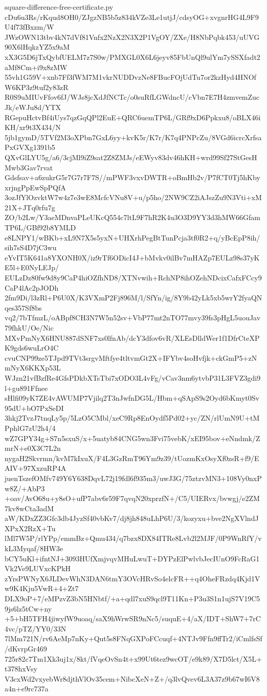 \documentclass[11pt]{article}
\theoremstyle{definition}
\theoremstyle{remark}
\begin{document}
\begin{filecontents*}[overwrite]{square-difference-free-certificate.py}
cDu6u3Rs/rKqud8OH0/ZJgzNB5b5z834kVZe3Le1utjJ/cdsyOG+xvgnrHG4L9F9U4f73fBxzm/W
JWzOWN13tbv4kN7dVf81Vnfx2NzX2N3X2P1VgOY/ZXe/H8NbPqbk453/uUVG90X6lHqkzYZ5x9aM
xX3G5D6jTxQybfUELM7z7S0w/PMXGL0X6L6jeyv85FbUnQl9ulYm7ySSXfadt2aMf8Cm+i9x8zMW
55vh1G59V+xnb7Ff3fWM7M1vkrNUDDvzNe8FBucFOjUdTu7or2kzHyd4HNOfW6KP3z9tuf2y83zR
R0S9uMIUvFfov6fJ/WJs8jcXdJfNCTc/o0suRfLGWdncU/cVbn7E7H4zmvemZucJk/eWJu8d/YTX
RGepuHctvBf4iUys7qzGqQPl2EuE+QRC6uemTP6L/GRf9xD6Ppkxu8/oBLX46iKH/xr9t3X434/N
5jb1gymD/5TVf2M3oXPbn7GxL6yy+kvK5r/K7r/K7q4PNPcZu/8VGd6icrcXrfsaPxGVXg1391b5
QXvGlLYU5g/a6/3cjMl9iZ9sat2Z8ZMJs/eEWyv83dv46hKH+wrd99Sf27StGesHMwb3Gav7rvat
Gdsfsav+a6zukrG5r7G7r7F7S//mPWF3vxvDWTR+oBmHb2v/P7fCT0Tj5hKbyxrjngPpEwSpPQfA
3ozJfYlOzvktW7w4z7e3wE8McfcVNu8V+u/p5ho/2NW9CZ2iAJszZu9N3Vti+xM21X+JTq0rfu7g
ZO/b2Lw/Y3aeMDnvaPLeUKcQ554c7ltL9F7hR2K4u3O3D9YY3d3hMW66GfamTP6L/GBf92b8YMLD
e8LNPY1/wBKb+xL9N7X5s5yxN+UHXrhPegBtTunPcja3tf0R2+q/yBcEpP8ih/sih7sS4D7jC3wu
eYvIT5K641a8YXONH0X/iz9rTf6ODicI4J+bMvkv0ilBv7mHAZp7EULz98s37yKE5l+E0NyLEJp/
EULzDz80fw9d8y9CaP4hiOZfhND8/XTNvwih+RchNP8ihOZehNDcixCafxFCcy9CaP4lAc2pJODh
2fm9Di/l3zRl+P6U0X/K3VXmP2Fj896M/l/SfYn/ig/8Y9b42yLk5xb5wrY2fyaQNqes357Sf8bs
vq2/7bTfmzL/oABpf8CH3N7W5n52sv+VbP77mt2nTO77mvy39fs3pHgL5uouJav79fhkU/Oe/Nic
MXvPmNyX6HNU887dSNF7xs0lfnAb/dcY3dfov6vR/XLEsDlldWer1f1DfrCteXPK9gds6wuLrO4C
cvuCNP99ze5TJpd9TVt3srgvMftfye4tltvmGt2X+IFYbv4soHvfjk+ckGmP5+zNmNyX6KKXp53L
WJzn21vfBzfRe4GfsPDkbXTsTbi7xODO3L4vFg/vCav3nm6ytvbP31L3FVZ3gdi9l+gu891Ffnee
sHlfi09yK7ZE4vAWUMP7Vjilq2T3nJwfnDG5L/Hbm+qSApS9s2Oyd6bKmyt0Sv95dU+bO7PxSeDI
3hkj2TvzJ7tnqLy5p/5LzO5CMbl/xeC9Rp8EnOydf5Pd02+yc/ZN/rlUmN9U+tMPphlG7zU2h4/4
wZ7GPY34g+S7n5sxuS/x+5uatyb84CNG5wn3Fvi75vebK/xEI95bov+eNndmk/ZmrN+e0X3C7L2n
nygaH2Skvrmn/kvM7kIxuX/F4L3GzRmT96Ym9z39/tUozmKxOsyXf0zsR+f9/EAIV+97XxzuRP4A
juenTszefOMfv749Y6Y638DqvL72j19fdl6f935m3/uwJ3G/75ztzvMN3+108Vy0nxPw8Z/+AbP3
+oav/AvO68u+y8sO+ufP7abv6r59F7qvqN20xprzfN+/C5/UIERvx/bvwgj/e2ZM7kv8wCta3adM
aW/KDxZZ3Gfc3db4JyzSf40vbKv7/dj8jh848uLhP6U/3/kozyxu+bve2NgXVlndJXPxX2RzX+Tu
lMl7W5P/rlYPp/emmBz+Qmu434/q7bzx8DX84ITRe8Lvb2l2MJF/0P9WnRfY/vkL3Myqaf/8HW3e
bCY5uKl+ifntNJ+3093HUfXmjvqvMHuLwuT+DYPzElPwlvbJecIUnO9FcRaG1Vk2Ve9LUVxcKPkH
zYrsPWNyX6JLDevWhN3DAN6tmY3OVcHRvSo4elcFR++q4OheFRzdq4Kjd1Vw9K4Kju5VwR+4+Zt7
DLX9oP+7/eMPzvZ3bN5HNbtf/+a+qdl7xuS9qcl9T11Kn+P3u3S1n1ujS7V19C59js6lz5tCw+ny
+5+bH5TFH4jiwyfW9uoaq/saX9hWrwSR9nNc5/suquE+4/aX/IDT+ShW7+7rC4vc/pTZ/YY0/33N
7lMm721N/rv6AeMp7nKy+Qut5s8FNqGXPoFCcuqf+4NTJv9Ffn9ffTr2/iCmlfsSf/dKvrpGr469
725r82c7Tm1Xk3uj1x/8kt/fVqeOvSn4t+x99Ut6tez9wcOT/e9k89/X7D5lct/X5L+t378hxVsy
V3cxWd2vxyebWr8djthVlOv35cem+NibcXeN+Z+/q3lvQvev6L3A37z9b67wI6V8a4n+e9rc737a

\end{filecontents*}
\end{document}
